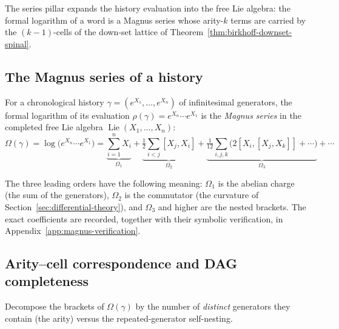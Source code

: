 
The series pillar expands the history evaluation into the free Lie algebra: the
formal logarithm of a word is a Magnus series whose arity-$k$ terms are carried
by the $(k-1)$-cells of the down-set lattice of
Theorem~\ref{thm:birkhoff-downset-spinal}.

\subsection{The Magnus series of a history}

\begin{definition}
\label{def:history-magnus-series}
For a chronological history $\gamma=(e^{X_1},\dots,e^{X_n})$ of infinitesimal
generators, the formal logarithm of its evaluation
$\rho(\gamma)=e^{X_n}\cdots e^{X_1}$ is the \emph{Magnus series} in the
completed free Lie algebra $\operatorname{Lie}(X_1,\dots,X_n)$:
\[
  \Omega(\gamma)
  =\log\bigl(e^{X_n}\cdots e^{X_1}\bigr)
  =\underbrace{\sum_{i=1}^n X_i}_{\Omega_1}
  +\underbrace{\tfrac12\sum_{i<j}[X_j,X_i]}_{\Omega_2}
  +\underbrace{\tfrac1{12}\sum_{i,j,k}\bigl(2[X_i,[X_j,X_k]]+\cdots\bigr)}_{\Omega_3}
  +\cdots
\]
\end{definition}

The three leading orders have the following meaning: $\Omega_1$ is the abelian
charge (the sum of the generators), $\Omega_2$ is the commutator (the curvature
of Section~\ref{sec:differential-theory}), and $\Omega_3$ and higher are the
nested brackets.  The exact coefficients are recorded, together with their
symbolic verification, in Appendix~\ref{app:magnus-verification}.

\subsection{Arity--cell correspondence and DAG completeness}

Decompose the brackets of $\Omega(\gamma)$ by the number of \emph{distinct}
generators they contain (the arity) versus the repeated-generator self-nesting.

